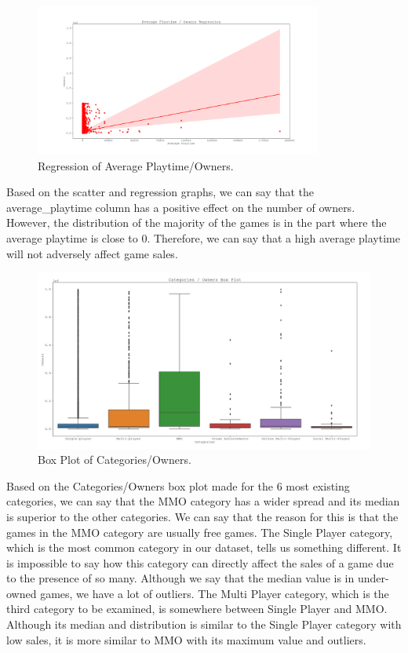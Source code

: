 \documentclass[conference]{IEEEtran}
\begin{document}
\begin{figure}[h]
  \includegraphics[width=\linewidth, height=5cm]{assets-2/average_playtime_owners_regression.png}
  \caption{Regression of Average Playtime/Owners.}
  \label{fig:average_playtime_owners2}
\end{figure}
\FloatBarrier

Based on the scatter and regression graphs, we can say that the average\_playtime column has a positive effect on the number of owners. However, the distribution of the majority of the games is in the part where the average playtime is close to 0. Therefore, we can say that a high average playtime will not adversely affect game sales.

\begin{figure}[h]
  \includegraphics[width=\linewidth]{assets-2/categories_owners_box.png}
  \caption{Box Plot of Categories/Owners.}
  \label{fig:categories_owners1}
\end{figure}
\FloatBarrier

Based on the Categories/Owners box plot made for the 6 most existing categories, we can say that the MMO category has a wider spread and its median is superior to the other categories. We can say that the reason for this is that the games in the MMO category are usually free games. The Single Player category, which is the most common category in our dataset, tells us something different. It is impossible to say how this category can directly affect the sales of a game due to the presence of so many. Although we say that the median value is in under-owned games, we have a lot of outliers. The Multi Player category, which is the third category to be examined, is somewhere between Single Player and MMO. Although its median and distribution is similar to the Single Player category with low sales, it is more similar to MMO with its maximum value and outliers.
\end{document}
